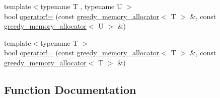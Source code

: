 \begin{DoxyCompactItemize}
\item 
{\footnotesize template$<$typename T , typename U $>$ }\\bool \hyperlink{namespaceuva_1_1utils_1_1containers_1_1alloc_a62ecab8a4413ec64a95b0429377caeaa}{operator!=} (const \hyperlink{classuva_1_1utils_1_1containers_1_1alloc_1_1greedy__memory__allocator}{greedy\+\_\+memory\+\_\+allocator}$<$ T $>$ \&, const \hyperlink{classuva_1_1utils_1_1containers_1_1alloc_1_1greedy__memory__allocator}{greedy\+\_\+memory\+\_\+allocator}$<$ U $>$ \&)
\item 
{\footnotesize template$<$typename T $>$ }\\bool \hyperlink{namespaceuva_1_1utils_1_1containers_1_1alloc_a5df4b3401f1fc6363869d3d898cb2538}{operator!=} (const \hyperlink{classuva_1_1utils_1_1containers_1_1alloc_1_1greedy__memory__allocator}{greedy\+\_\+memory\+\_\+allocator}$<$ T $>$ \&, const \hyperlink{classuva_1_1utils_1_1containers_1_1alloc_1_1greedy__memory__allocator}{greedy\+\_\+memory\+\_\+allocator}$<$ T $>$ \&)
\end{DoxyCompactItemize}


\subsection{Function Documentation}
\hypertarget{namespaceuva_1_1utils_1_1containers_1_1alloc_ae65da467dfcf6c2ee5cc8dd2be1ca469}{}
